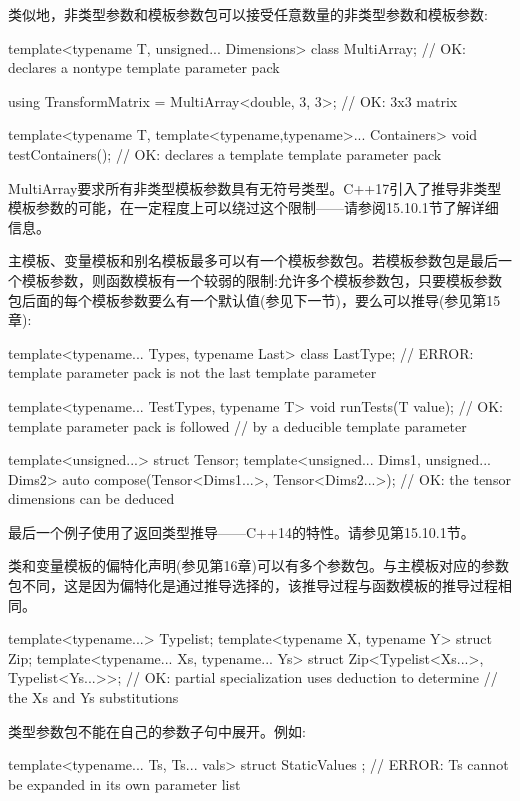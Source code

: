 类似地，非类型参数和模板参数包可以接受任意数量的非类型参数和模板参数:

\begin{cpp}
template<typename T, unsigned... Dimensions>
class MultiArray; // OK: declares a nontype template parameter pack

using TransformMatrix = MultiArray<double, 3, 3>; // OK: 3x3 matrix

template<typename T, template<typename,typename>... Containers>
void testContainers(); // OK: declares a template template parameter pack
\end{cpp}

MultiArray要求所有非类型模板参数具有无符号类型。C++17引入了推导非类型模板参数的可能，在一定程度上可以绕过这个限制——请参阅15.10.1节了解详细信息。

主模板、变量模板和别名模板最多可以有一个模板参数包。若模板参数包是最后一个模板参数，则函数模板有一个较弱的限制:允许多个模板参数包，只要模板参数包后面的每个模板参数要么有一个默认值(参见下一节)，要么可以推导(参见第15章):

\begin{cpp}
template<typename... Types, typename Last>
class LastType; // ERROR: template parameter pack is not the last template parameter

template<typename... TestTypes, typename T>
void runTests(T value); // OK: template parameter pack is followed
// by a deducible template parameter

template<unsigned...> struct Tensor;
template<unsigned... Dims1, unsigned... Dims2>
auto compose(Tensor<Dims1...>, Tensor<Dims2...>);
// OK: the tensor dimensions can be deduced
\end{cpp}

最后一个例子使用了返回类型推导——C++14的特性。请参见第15.10.1节。

类和变量模板的偏特化声明(参见第16章)可以有多个参数包。与主模板对应的参数包不同，这是因为偏特化是通过推导选择的，该推导过程与函数模板的推导过程相同。

\begin{cpp}
template<typename...> Typelist;
template<typename X, typename Y> struct Zip;
template<typename... Xs, typename... Ys>
	struct Zip<Typelist<Xs...>, Typelist<Ys...>>;
	// OK: partial specialization uses deduction to determine
	// the Xs and Ys substitutions
\end{cpp}

类型参数包不能在自己的参数子句中展开。例如:

\begin{cpp}
template<typename... Ts, Ts... vals> struct StaticValues {};
// ERROR: Ts cannot be expanded in its own parameter list
\end{cpp}

